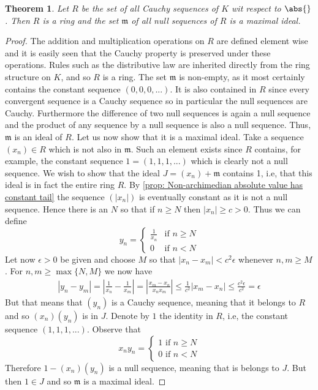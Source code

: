 \documentclass{article}
\newtheorem{theorem}{Theorem}[section]
\newcommand{\mfrak}[1]{\mathfrak{#1}}
\numberwithin{equation}{section}
\begin{document}
\begin{theorem}\label{thm: Null sequences is maximal ideal}
    Let $R$ be the set of all Cauchy sequences of $K$ wit respect to $\abs{}$. Then $R$ is a ring and the set $\mfrak m$ of all null sequences of $R$ is a maximal ideal.
\end{theorem}
\begin{proof}
    The addition and multiplication operations on $R$ are defined element wise and it is easily seen that the Cauchy property is preserved under these operations. Rules such as the distributive law are inherited directly from the ring structure on $K$, and so $R$ is a ring. The set $\mfrak m$ is non-empty, as it most certainly contains the constant sequence $(0,0,0,...)$. It is also contained in $R$ since every convergent sequence is a Cauchy sequence so in particular the null sequences are Cauchy. Furthermore the difference of two null sequences is again a null sequence and the product of any sequence by a null sequence is also a null sequence. Thus, $\mfrak m$ is an ideal of $R$. Let us now show that it is a maximal ideal. Take a sequence $(x_n) \in R$ which is not also in $\mfrak m$. Such an element exists since $R$ contains, for example, the constant sequence $1 = (1,1,1, ...)$ which is clearly not a null sequence. We wish to show that the ideal $J = (x_n) + \mfrak m$ contains 1, i.e, that this ideal is in fact the entire ring $R$. By \cref{prop: Non-archimedian absolute value has constant tail} the sequence $(|x_n|)$ is eventually constant as it is not a null sequence. Hence there is an $N$ so that if $n \geq N$ then $|x_n| \geq c > 0$. Thus we can define
    $$y_n = \begin{cases} \frac{1}{x_n} & \text{if } n \geq N \\ 0 & \text{if } n < N \end{cases}$$
    Let now $\epsilon > 0$ be given and choose $M$ so that $|x_n - x_m| < c^2 \epsilon$ whenever $n,m \geq M$. For $n,m \geq \max\{N,M\}$ we now have
    \begin{align*}
        |y_n - y_m| = |\frac{1}{x_n} - \frac{1}{x_m}| = |\frac{x_m - x_n}{x_n x_m}| \leq \frac{1}{c^2} |x_m - x_n| \leq \frac{c^2 \epsilon}{c^2} = \epsilon
    \end{align*}
    But that means that $(y_n)$ is a Cauchy sequence, meaning that it belongs to $R$ and so $(x_n)(y_n)$ is in $J$. Denote by $1$ the identity in $R$, i.e, the constant sequence $(1,1,1, ...)$. Observe that 
    $$x_ny_n = \begin{cases}
        1 \text{ if } n \geq N \\
        0 \text{ if } n < N 
    \end{cases}$$
    Therefore $1 - (x_n) (y_n)$ is a null sequence, meaning that is belongs to $J$. But then $1 \in J$ and so $\mfrak m$ is a maximal ideal.
\end{proof}
\end{document}
